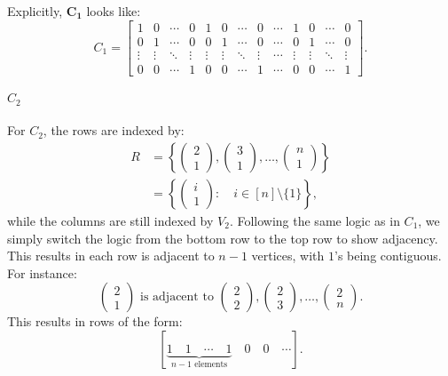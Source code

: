 Explicitly, \( \mathbf{C_1} \) looks like:
\[
C_1 = 
\begin{bmatrix}
1 & 0 & \cdots & 0 & 1 & 0 & \cdots & 0 & \cdots & 1 & 0 & \cdots & 0 \\
0 & 1 & \cdots & 0 & 0 & 1 & \cdots & 0 & \cdots & 0 & 1 & \cdots & 0 \\
\vdots & \vdots & \ddots & \vdots & \vdots & \vdots & \ddots & \vdots & \cdots & \vdots & \vdots & \ddots & \vdots \\
0 & 0 & \cdots & 1 & 0 & 0 & \cdots & 1 & \cdots & 0 & 0 & \cdots & 1
\end{bmatrix}.
\]

\paragraph{\texorpdfstring{$C_2$}{C2}}

For \( C_2 \), the rows are indexed by:
\begin{align*}
R &= \left\{\begin{pmatrix} 2 \\ 1 \end{pmatrix}, \begin{pmatrix} 3 \\ 1 \end{pmatrix}, \dots, \begin{pmatrix} n \\ 1 \end{pmatrix}\right\} \\
&= \left\{\begin{pmatrix}i \\ 1\end{pmatrix}:\quad i\in[n]\setminus\{1\}\right\},
\end{align*}
while the columns are still indexed by \(V_2\). Following the same logic as in \(C_1\), we simply switch the logic from the bottom row to the top row to show adjacency.\\

This results in each row is adjacent to \( n-1 \) vertices, with \( 1 \)'s being contiguous. For instance:
\[
\begin{pmatrix} 2 \\ 1 \end{pmatrix} \text{ is adjacent to } \begin{pmatrix} 2 \\ 2 \end{pmatrix}, \begin{pmatrix} 2 \\ 3 \end{pmatrix}, \dots, \begin{pmatrix} 2 \\ n \end{pmatrix}.
\]
This results in rows of the form:
\[
[\underbrace{1 \quad 1 \quad \cdots \quad 1}_{n-1 \text{ elements}} \quad 0 \quad 0 \quad \cdots].
\]

